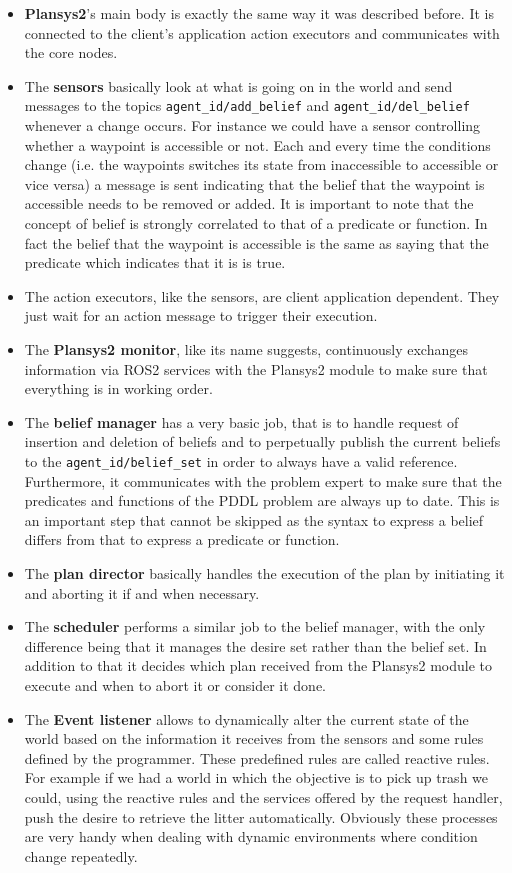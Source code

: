 \begin{itemize}
    \item \textbf{Plansys2}'s main body is exactly the same way it was described before. It is connected to the client's application action executors and communicates with the core nodes.
    \item The \textbf{sensors} basically look at what is going on in the world and send messages to the topics \texttt{agent\_id/add\_belief} and \texttt{agent\_id/del\_belief} whenever a change occurs. For instance we could have a sensor controlling whether a waypoint is accessible or not. Each and every time the conditions change (i.e. the waypoints switches its state from inaccessible to accessible or vice versa) a message is sent indicating that the belief that the waypoint is accessible needs to be removed or added. It is important to note that the concept of belief is strongly correlated to that of a predicate or function. In fact the belief that the waypoint is accessible is the same as saying that the predicate which indicates that it is is true.
    \item The action executors, like the sensors, are client application dependent. They just wait for an action message to trigger their execution.
    \item The \textbf{Plansys2 monitor}, like its name suggests, continuously exchanges information via ROS2 services with the Plansys2 module to make sure that everything is in working order.
    \item The \textbf{belief manager} has a very basic job, that is to handle request of insertion and deletion of beliefs and to perpetually publish the current beliefs to the \texttt{agent\_id/belief\_set} in order to always have a valid reference. Furthermore, it communicates with the problem expert to make sure that the predicates and functions of the PDDL problem are always up to date. This is an important step that cannot be skipped as the syntax to express a belief differs from that to express a predicate or function.
    \item The \textbf{plan director} basically handles the execution of the plan by initiating it and aborting it if and when necessary.
    \item The \textbf{scheduler} performs a similar job to the belief manager, with the only difference being that it manages the desire set rather than the belief set. In addition to that it decides which plan received from the Plansys2 module to execute and when to abort it or consider it done. 
    \item The \textbf{Event listener} allows to dynamically alter the current state of the world based on the information it receives from the sensors and some rules defined by the programmer. These predefined rules are called reactive rules. For example if we had a world in which the objective is to pick up trash we could, using the reactive rules and the services offered by the request handler, push the desire to retrieve the litter automatically. Obviously these processes are very handy when dealing with dynamic environments where condition change repeatedly.

\end{itemize}
